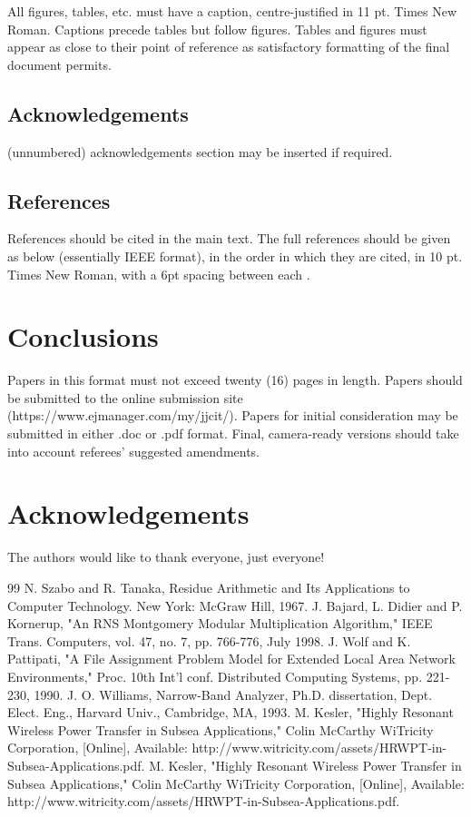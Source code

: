 \documentclass[11pt,twoside]{articleJJCIT}
\begin{document}
All figures, tables, etc. must have a caption, centre-justified in 11 pt. Times New Roman. Captions precede tables but follow figures.  Tables and figures must appear as close to their point of reference as satisfactory formatting of the final document permits.

\subsection{Acknowledgements}
(unnumbered) acknowledgements section may be inserted if required.
\subsection{References}
References should be cited in the main text.  The full references should be given as below (essentially IEEE format), in the order in which they are cited, in 10 pt. Times New Roman, with a 6pt spacing between each \cite{[1]}.

\section{Conclusions}
Papers in this format must not exceed twenty (16) pages in length. Papers should be submitted to the online submission site (https://www.ejmanager.com/my/jjcit/). Papers for initial consideration may be submitted in either .doc or .pdf format. Final, camera-ready versions should take into account referees’ suggested amendments.
\section*{Acknowledgements}
The authors would like to thank everyone, just everyone!

\begin{thebibliography}{99}
\bibitem{[1]} N. Szabo and R. Tanaka, Residue Arithmetic and Its Applications to Computer Technology. New York: McGraw Hill, 1967.
\bibitem{[2]}	J. Bajard, L. Didier and P. Kornerup, "An RNS Montgomery Modular Multiplication Algorithm," IEEE Trans. Computers, vol. 47, no. 7, pp. 766-776, July 1998.
\bibitem{[3]} 	J. Wolf and K. Pattipati, "A File Assignment Problem Model for Extended Local Area Network Environments," Proc. 10th Int'l conf. Distributed Computing Systems, pp. 221-230, 1990.
\bibitem{[4]}	J. O. Williams, Narrow-Band Analyzer, Ph.D. dissertation, Dept. Elect. Eng., Harvard Univ., Cambridge, MA, 1993.
\bibitem{[5]}	M. Kesler, "Highly Resonant Wireless Power Transfer in Subsea Applications," Colin McCarthy WiTricity Corporation, [Online], Available: http://www.witricity.com/assets/HRWPT-in-Subsea-Applications.pdf.
\bibitem{[6]}	M. Kesler, "Highly Resonant Wireless Power Transfer in Subsea Applications," Colin McCarthy WiTricity Corporation, [Online], Available: http://www.witricity.com/assets/HRWPT-in-Subsea-Applications.pdf.
\end{thebibliography}
\end{document}
